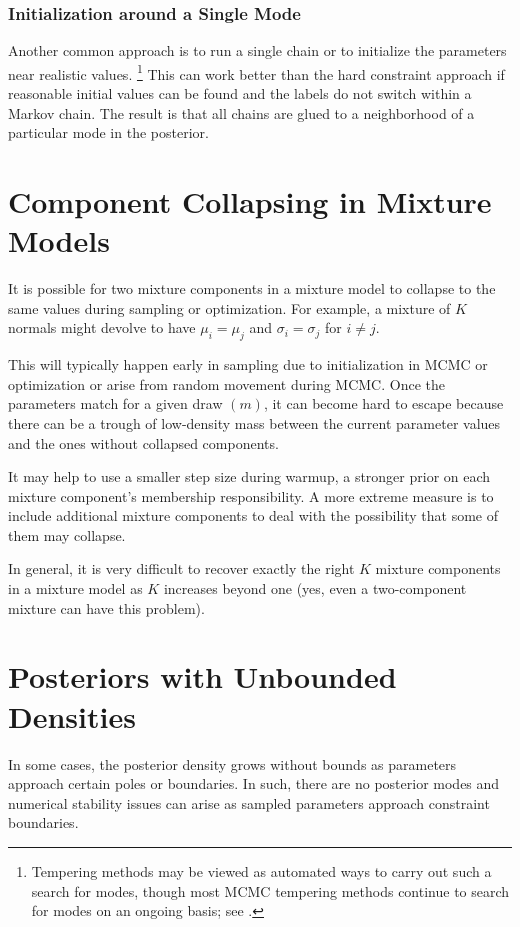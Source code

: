 \subsubsection{Initialization around a Single Mode}

Another common approach is to run a single chain or to initialize the
parameters near realistic values.%
%
\footnote{Tempering methods may be viewed as automated ways to carry
  out such a search for modes, though most MCMC tempering methods
  continue to search for modes on an ongoing basis; see
  \citep{SwendsenWang:1986, Neal:1996b}.}
%
This can work better than the hard constraint approach if reasonable
initial values can be found and the labels do not switch within a
Markov chain.  The result is that all chains are glued to a
neighborhood of a particular mode in the posterior.

\section{Component Collapsing in Mixture Models}

It is possible for two mixture components in a mixture model to
collapse to the same values during sampling or optimization.  For
example, a mixture of $K$ normals might devolve to have $\mu_i =
\mu_j$ and $\sigma_i = \sigma_j$ for $i \neq j$.

This will typically happen early in sampling due to initialization in
MCMC or optimization or arise from random movement during MCMC.  Once
the parameters match for a given draw $(m)$, it can become hard to
escape because there can be a trough of low-density mass between the
current parameter values and the ones without collapsed components.

It may help to use a smaller step size during warmup, a stronger prior
on each mixture component's membership responsibility.  A more extreme
measure is to include additional mixture components to deal with the
possibility that some of them may collapse.

In general, it is very difficult to recover exactly the right $K$
mixture components in a mixture model as $K$ increases beyond one
(yes, even a two-component mixture can have this problem).


\section{Posteriors with Unbounded Densities}

In some cases, the posterior density grows without bounds as
parameters approach certain poles or boundaries.  In such, there
are no posterior modes and numerical stability issues can arise as
sampled parameters approach constraint boundaries.

